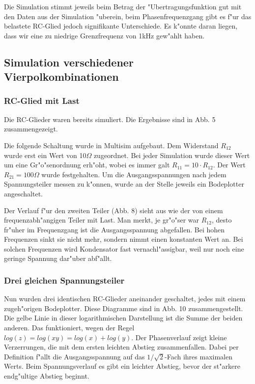 \documentclass[10pt]{article}
\begin{document}
Die Simulation stimmt jeweils beim Betrag der "Ubertragungsfunktion gut mit den Daten aus der Simulation "uberein, beim Phasenfrequenzgang gibt es f"ur das belastete RC-Glied jedoch signifikante Unterschiede. Es k"onnte daran liegen, dass wir eine zu niedrige Grenzfrequenz von 1kHz gew"ahlt haben.




%
\newpage
\subsection{Simulation verschiedener Vierpolkombinationen}
\subsubsection{RC-Glied mit Last}
Die RC-Glieder waren bereits simuliert. Die Ergebnisse sind in Abb. 5 zusammengezeigt.



Die folgende Schaltung wurde in Multisim aufgebaut. Dem Widerstand $R_{12}$ wurde erst ein Wert von 10$\Omega$ zugeordnet. Bei jeder Simulation wurde dieser Wert um eine Gr"o"senordnung erh"oht, wobei es immer galt $R_{11}=10 \cdot R_{12}$. Der Wert $R_{21} = 100\Omega$ wurde festgehalten. Um die Ausgangsspannungen nach jedem Spannungsteiler messen zu k"onnen, wurde an der Stelle jeweils ein Bodeplotter angeschaltet.

Der Verlauf f"ur den zweiten Teiler (Abb. 8) sieht aus wie der von einem frequenzabh"angigen Teiler mit Last. Man merkt, je gr"o"ser war $R_{12}$, desto fr"uher im Frequenzgang ist die Ausgangsspannung abgefallen. Bei hohen Frequenzen sinkt sie nicht mehr, sondern nimmt einen konstanten Wert an. Bei solchen Frequenzen wird Kondensator fast vernachl"assigbar, weil nur noch eine geringe Spannung dar"uber abf"allt. 

\subsubsection{Drei gleichen Spannungsteiler}
Nun wurden drei identischen RC-Glieder aneinander geschaltet, jedes mit einem zugeh"origen Bodeplotter. Diese Diagramme sind in Abb. 10 zusammengestellt. Die gelbe Linie in dieser logarithmischen Darstellung ist die Summe der beiden anderen. Das funktioniert, wegen der Regel $log(z)=log(xy)=log(x)+log(y)$. Der Phasenverlauf zeigt kleine Verzerrungen, die mit dem ersten leichten Abstieg zusammenfallen. Dabei per Definition f"allt die Ausgangsspannung auf das $1/\sqrt{2}$-Fach ihres maximalen Werts. Beim Spannungsverlauf es gibt ein leichter Abstieg, bevor der st"arkere endg"ultige Abstieg beginnt.
\end{document}
